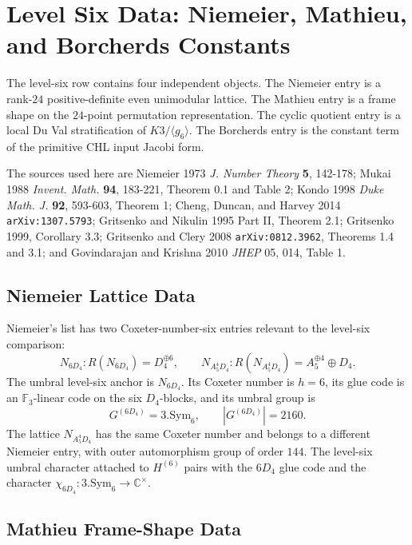 \providecommand{\kBKM}{\kappa_{\mathrm{BKM}}}
\providecommand{\kch}{\kappa_{\mathrm{ch}}}
\providecommand{\kcat}{\kappa_{\mathrm{cat}}}
\providecommand{\kfib}{\kappa_{\mathrm{fiber}}}
\providecommand{\cO}{\mathcal{O}}
\providecommand{\C}{\mathbb{C}}
\providecommand{\Z}{\mathbb{Z}}

\section*{Level Six Data: Niemeier, Mathieu, and Borcherds Constants}

The level-six row contains four independent objects. The Niemeier entry
is a rank-$24$ positive-definite even unimodular lattice. The Mathieu
entry is a frame shape on the $24$-point permutation representation.
The cyclic quotient entry is a local Du Val stratification of
$K3/\langle g_6\rangle$. The Borcherds entry is the constant term of
the primitive CHL input Jacobi form.

The sources used here are Niemeier 1973 \emph{J. Number Theory}
\textbf{5}, 142-178; Mukai 1988 \emph{Invent. Math.} \textbf{94},
183-221, Theorem 0.1 and Table 2; Kondo 1998 \emph{Duke Math. J.}
\textbf{92}, 593-603, Theorem 1; Cheng, Duncan, and Harvey 2014
\texttt{arXiv:1307.5793}; Gritsenko and Nikulin 1995 Part II,
Theorem 2.1; Gritsenko 1999, Corollary 3.3; Gritsenko and Clery 2008
\texttt{arXiv:0812.3962}, Theorems 1.4 and 3.1; and Govindarajan and
Krishna 2010 \emph{JHEP} 05, 014, Table 1.

\subsection*{Niemeier Lattice Data}

Niemeier's list has two Coxeter-number-six entries relevant to the
level-six comparison:
\[
N_{6D_4}\colon R(N_{6D_4}) = D_4^{\oplus 6}, \qquad
N_{A_5^4D_4}\colon R(N_{A_5^4D_4}) = A_5^{\oplus 4}\oplus D_4 .
\]
The umbral level-six anchor is \(N_{6D_4}\). Its Coxeter number is
\(h = 6\), its glue code is an \(\mathbb{F}_3\)-linear code on the six
\(D_4\)-blocks, and its umbral group is
\[
G^{(6D_4)}=3.\mathrm{Sym}_6,\qquad |G^{(6D_4)}|=2160 .
\]
The lattice \(N_{A_5^4D_4}\) has the same Coxeter number and belongs to
a different Niemeier entry, with outer automorphism group of order
\(144\). The level-six umbral character attached to \(H^{(6)}\) pairs
with the \(6D_4\) glue code and the character
\(\chi_{6D_4}\colon 3.\mathrm{Sym}_6\to\C^\times\).

\subsection*{Mathieu Frame-Shape Data}

